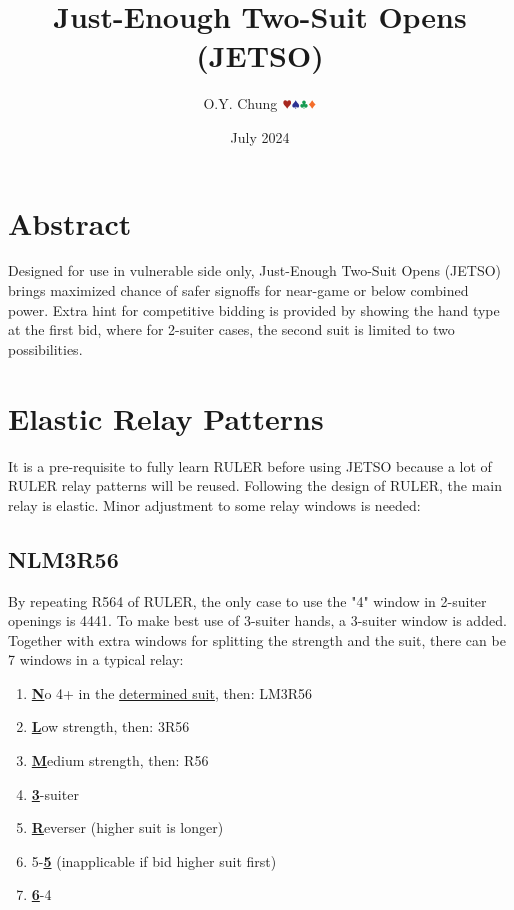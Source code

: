 \documentclass{article}
\title{\vspace{-1em}Just-Enough Two-Suit Opens (JETSO)}
\author{O.Y. Chung $\hhh\sss\ccc\ddd$}
\date{July 2024}
\begin{document}
\maketitle
\begin{multicols}{2}
\begin{CJK*}{UTF8}{gt}

\section{Abstract}
Designed for use in vulnerable side only, Just-Enough Two-Suit Opens (JETSO) brings maximized chance of safer signoffs for near-game or below combined power. Extra hint for competitive bidding is provided by showing the hand type at the first bid, where for 2-suiter cases, the second suit is limited to two possibilities.

\section{Elastic Relay Patterns}
It is a pre-requisite to fully learn RULER before using JETSO because a lot of RULER relay patterns will be reused.  Following the design of RULER, the main relay is elastic. Minor adjustment to some relay windows is needed:
\subsection{NLM3R56}\label{sec:nlm3r56}
By repeating R564 of RULER, the only case to use the "4" window in 2-suiter openings is 4441. To make best use of 3-suiter hands, a 3-suiter window is added. Together with extra windows for splitting the strength and the suit, there can be 7 windows in a typical relay:
\begin{enumerate}
    \item \textbf{\underline{N}}o 4+ in the \hyperref[sec:determine-n-suit]{determined suit}, then: LM3R56
    \item \textbf{\underline{L}}ow strength, then: 3R56
    \item \textbf{\underline{M}}edium strength, then: R56
    \item \textbf{\underline{3}}-suiter
    \item \textbf{\underline{R}}everser (higher suit is longer)
    \item 5-\textbf{\underline{5}} (inapplicable if bid higher suit first)
    \item \textbf{\underline{6}}-4
\end{enumerate}


\end{CJK*}
\end{multicols}
\end{document}
